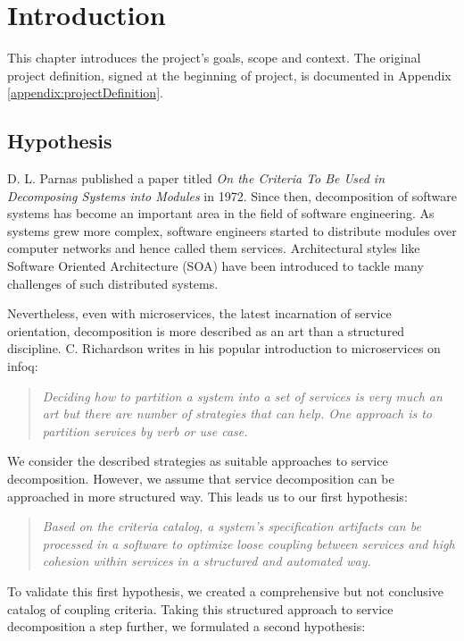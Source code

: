 \chapter{Introduction}

This chapter introduces the project's goals, scope and context. The original project definition, signed at the beginning of project, is documented in Appendix \ref{appendix:projectDefinition}.

\section{Hypothesis}

D. L. Parnas published a paper titled \textit{On the Criteria To Be Used in Decomposing Systems into Modules}\cite{parnaDecomposing} in 1972. Since then, decomposition of software systems has become an important area in the field of software engineering. As systems grew more complex, software engineers started to distribute modules over computer networks and hence called them services. Architectural styles like Software Oriented Architecture (SOA) have been introduced to tackle many challenges of such distributed systems.

Nevertheless, even with microservices, the latest incarnation of service orientation, decomposition is more described as an art than a structured discipline. C. Richardson writes in his popular introduction to microservices on \gls{infoq}:

\begin{quote}
	\textit{Deciding how to partition a system into a set of services is very much an art but there are number of strategies that can help. One approach is to partition services by verb or use case.}\cite{richardson2014microservices}
\end{quote}

We consider the described strategies as suitable approaches to service decomposition. However, we assume that service decomposition can be approached in more structured way. This leads us to our first hypothesis:

\begin{quote}
	\textit{Based on the criteria catalog, a system's specification artifacts can be processed in a software to optimize loose coupling between services and high cohesion within services in a structured and automated way.}
\end{quote}

\clearpage

To validate this first hypothesis, we created a comprehensive but not conclusive catalog of coupling criteria. Taking this structured approach to service decomposition a step further, we formulated a second hypothesis:

